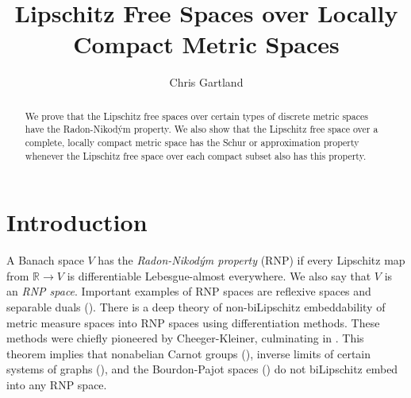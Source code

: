 \documentclass[12pt]{amsart}
\theoremstyle{definition}
\numberwithin{equation}{section}
\def \R {\mathbb{R}}
\begin{document}

\baselineskip=17pt


\title{Lipschitz Free Spaces over Locally Compact Metric Spaces}

\author{Chris Gartland}
\address{Department of Mathematics, Texas A\&M University, College Station, TX 77843, USA}

\date{}


\begin{abstract}
We prove that the Lipschitz free spaces over certain types of discrete metric spaces have the Radon-Nikod\'ym property. We also show that the Lipschitz free space over a complete, locally compact metric space has the Schur or approximation property whenever the Lipschitz free space over each compact subset also has this property.
\end{abstract}



\maketitle




\tableofcontents

\section{Introduction}
A Banach space $V$ has the \emph{Radon-Nikod\'ym property} (RNP) if every Lipschitz map from $\R \to V$ is differentiable Lebesgue-almost everywhere. We also say that $V$ is an \emph{RNP space}. Important examples of RNP spaces are reflexive spaces and separable duals (\cite[Corollary 2.15]{P}). There is a deep theory of non-biLipschitz embeddability of metric measure spaces into RNP spaces using differentiation methods. These methods were chiefly pioneered by Cheeger-Kleiner, culminating in \cite[Theorem 1.6]{CKRNP}. This theorem implies that nonabelian Carnot groups (\cite[Theorem 6.1]{CKBanach}), inverse limits of certain systems of graphs (\cite[Theorem 10.2]{CKgraphs}), and the Bourdon-Pajot spaces (\cite[Corollary 1.7]{CKRNP}) do not biLipschitz embed into any RNP space.
\end{document}
